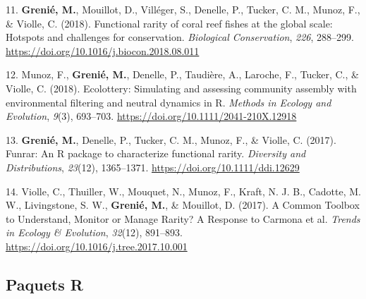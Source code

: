 \documentclass[10pt,a4paper,]{article}
\begin{document}
\leavevmode{}%
11. \textbf{Grenié, M.}, Mouillot, D., Villéger, S., Denelle, P.,
Tucker, C. M., Munoz, F., \& Violle, C. (2018). Functional rarity of
coral reef fishes at the global scale: Hotspots and challenges for
conservation. \emph{Biological Conservation}, \emph{226}, 288--299.
\url{https://doi.org/10.1016/j.biocon.2018.08.011}

\leavevmode{}%
12. Munoz, F., \textbf{Grenié, M.}, Denelle, P., Taudière, A., Laroche,
F., Tucker, C., \& Violle, C. (2018). Ecolottery: Simulating and
assessing community assembly with environmental filtering and neutral
dynamics in R. \emph{Methods in Ecology and Evolution}, \emph{9}(3),
693--703. \url{https://doi.org/10.1111/2041-210X.12918}

\leavevmode{}%
13. \textbf{Grenié, M.}, Denelle, P., Tucker, C. M., Munoz, F., \&
Violle, C. (2017). Funrar: An R package to characterize functional
rarity. \emph{Diversity and Distributions}, \emph{23}(12), 1365--1371.
\url{https://doi.org/10.1111/ddi.12629}

\leavevmode{}%
14. Violle, C., Thuiller, W., Mouquet, N., Munoz, F., Kraft, N. J. B.,
Cadotte, M. W., Livingstone, S. W., \textbf{Grenié, M.}, \& Mouillot, D.
(2017). A Common Toolbox to Understand, Monitor or Manage Rarity? A
Response to Carmona et al. \emph{Trends in Ecology \& Evolution},
\emph{32}(12), 891--893.
\url{https://doi.org/10.1016/j.tree.2017.10.001}

\hypertarget{paquets-r}{%
\subsection{Paquets R}\label{paquets-r}}
\end{document}
